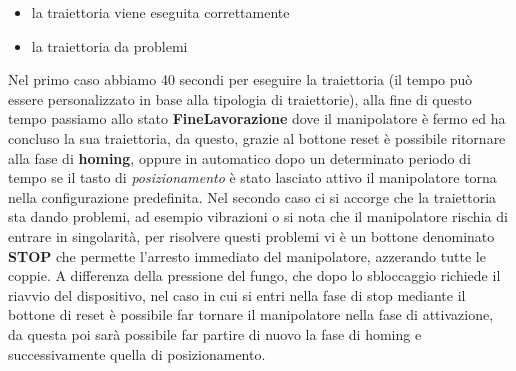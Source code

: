 \begin{itemize}
	\item la traiettoria viene eseguita correttamente
	\item la traiettoria da problemi
\end{itemize}
Nel primo caso abbiamo 40 secondi per eseguire la traiettoria (il tempo può essere personalizzato in base alla tipologia di traiettorie), alla fine di questo tempo passiamo allo stato \textbf{FineLavorazione} dove il manipolatore è fermo ed ha concluso la sua traiettoria, da questo, grazie al bottone reset è possibile ritornare alla fase di \textbf{homing}, oppure in automatico dopo un determinato periodo di tempo se il tasto di \textit{posizionamento} è stato lasciato attivo il manipolatore torna nella configurazione predefinita. Nel secondo caso ci si accorge che la traiettoria sta dando problemi, ad esempio vibrazioni o si nota che il manipolatore rischia di entrare in singolarità, per risolvere questi problemi vi è un bottone denominato \textbf{STOP} che permette l'arresto immediato del manipolatore, azzerando tutte le coppie. A differenza della pressione del fungo, che dopo lo sbloccaggio richiede il riavvio del dispositivo, nel caso in cui si entri nella fase di stop mediante il bottone di reset è possibile far tornare il manipolatore nella fase di attivazione, da questa poi sarà possibile far partire di nuovo la fase di homing e successivamente quella di posizionamento.
